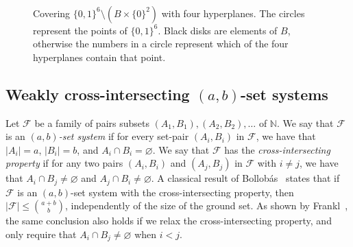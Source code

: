 \documentclass[11pt,english]{article}
\theoremstyle{plain}
\newtheorem{problem}[theorem]{Problem}
\theoremstyle{remark}
\newcommand{\F}{\mathcal{F}}
\let\emptyset\varnothing
\begin{document}
\begin{figure}[!ht]
    \centering
    
    
    ~
    
    
    
    
    \hspace{0.3in}
    
    \hspace{0.3in}
    
    \hspace{0.3in}
    
    \caption{Covering $\{0,1\}^6\setminus (B\times \{0\}^2)$ with four hyperplanes. The circles represent the points of $\{0,1\}^6$. Black disks are elements of $B$, otherwise the numbers in a circle represent which of the four hyperplanes contain that point.}
    \label{fig:carla}
\end{figure}

\subsection{Weakly cross-intersecting \texorpdfstring{$(a,b)$}{(a,b)}-set systems}\label{subsec:domotor}

Let $\F$ be a family of pairs subsets $(A_1,B_1), (A_2,B_2), \ldots$ of $\mathbb{N}$. We say that $\F$ is an $(a,b)$\emph{-set system} if for every set-pair $(A_i,B_i)$ in $\F$, we have that $|A_i|=a$, $|B_i|=b$, and $A_i\cap B_i=\emptyset$. We say that $\F$ has the \emph{cross-intersecting property} if for any two pairs $(A_i,B_i)$ and $(A_j,B_j)$ in $\F$ with $i\neq j$, we have that $A_i\cap B_j\neq \emptyset$ and $A_j\cap B_i \neq \emptyset$. A classical result of Bollob\'as~\cite{bollsetpair} states that if $\F$ is an $(a,b)$-set system with the cross-intersecting property, then $|\F|\leq \binom{a+b}{b}$, independently of the size of the ground set. As shown by Frankl~\cite{frankl}, the same conclusion also holds if we relax the cross-intersecting property, and only require that $A_i\cap B_j\neq \emptyset$ when $i<j$. 
\end{document}
